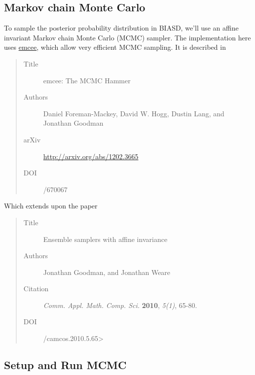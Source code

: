\documentclass[letterpaper,10pt,english]{sphinxmanual}
\begin{document}
\subsection{Markov chain Monte Carlo}
\label{code_mcmc:markov-chain-monte-carlo}
To sample the posterior probability distribution in BIASD, we'll use an affine invariant Markov chain Monte Carlo (MCMC) sampler. The implementation here uses \href{http://dan.iel.fm/emcee/current/}{emcee}, which allow very efficient MCMC sampling. It is described in
\begin{quote}\begin{description}
\item[{Title}] \leavevmode
emcee: The MCMC Hammer

\item[{Authors}] \leavevmode
Daniel Foreman-Mackey,
David W. Hogg,
Dustin Lang,
and Jonathan Goodman

\item[{arXiv}] \leavevmode
\url{http://arxiv.org/abs/1202.3665}

\item[{DOI}] /670067

\end{description}\end{quote}

Which extends upon the paper
\begin{quote}\begin{description}
\item[{Title}] \leavevmode
Ensemble samplers with affine invariance

\item[{Authors}] \leavevmode
Jonathan Goodman,
and Jonathan Weare

\item[{Citation}] \leavevmode
\emph{Comm. Appl. Math. Comp. Sci.} \textbf{2010}, \emph{5(1)}, 65-80.

\item[{DOI}] /camcos.2010.5.65\textgreater{}

\end{description}\end{quote}


\subsection{Setup and Run MCMC}
\label{code_mcmc:setup-and-run-mcmc}\label{code_mcmc:module-mcmc}\label{code_mcmc:module-mcmc}
\end{document}
